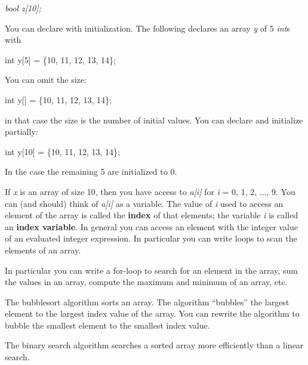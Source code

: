 \documentclass[
]{article}
\begin{document}
\emph{bool z{[}10{]};}

You can declare with initialization. The following declares an array
\emph{y} of 5 \emph{int}s with

int y{[}5{]} = \{10, 11, 12, 13, 14\};

You can omit the size:

int y{[}{]} = \{10, 11, 12, 13, 14\};

in that case the size is the number of initial values. You can declare
and initialize partially:

int y{[}10{]} = \{10, 11, 12, 13, 14\};

In the case the remaining 5 are initialized to 0.

If \emph{x} is an array of size 10, then you have access to
\emph{a{[}i{]}} for \emph{i} = 0, 1, 2, ..., 9. You can (and should)
think of \emph{a{[}i{]}} as a variable. The value of \emph{i} used to
access an element of the array is called the \textbf{index} of that
elements; the variable \emph{i} is called an \textbf{index variable}. In
general you can access an element with the integer value of an evaluated
integer expression. In particular you can write loops to scan the
elements of an array.

In particular you can write a for-loop to search for an element in the
array, sum the values in an array, compute the maximum and minimum of an
array, etc.

The bubblesort algorithm sorts an array. The algorithm ``bubbles'' the
largest element to the largest index value of the array. You can rewrite
the algorithm to bubble the smallest element to the smallest index
value.

The binary search algorithm searches a sorted array more efficiently
than a linear search.
\end{document}
